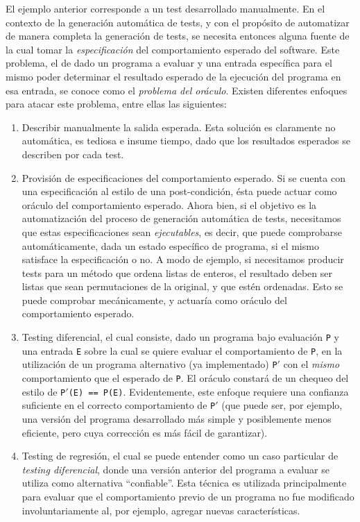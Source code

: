 El ejemplo anterior corresponde a un test desarrollado manualmente. En el contexto de la generaci\'on autom\'atica de tests, y con el prop\'osito de automatizar de manera completa la generaci\'on de tests, se necesita entonces alguna fuente de la cual tomar la \emph{especificaci\'on} del comportamiento esperado del software. Este problema, el de dado un programa a evaluar y una entrada espec\'ifica para el mismo poder determinar el resultado esperado de la ejecuci\'on del programa en esa entrada, se conoce como el \emph{problema del or\'aculo}. Existen diferentes enfoques para atacar este problema, entre ellas las siguientes: 
\begin{enumerate}
	\item Describir manualmente la salida esperada. Esta soluci\'on es claramente no autom\'atica, es tediosa e insume tiempo, dado que los resultados esperados se describen por cada test.
	
    \item Provisi\'on de especificaciones del comportamiento esperado. Si se cuenta con una especificaci\'on al estilo de una post-condici\'on, \'esta puede actuar como or\'aculo del comportamiento esperado. Ahora bien, si el objetivo es la automatizaci\'on del proceso de generaci\'on autom\'atica de tests, necesitamos que estas especificaciones sean \emph{ejecutables}, es decir, que puede comprobarse autom\'aticamente, dada un estado espec\'ifico de programa, si el mismo satisface la especificaci\'on o no. A modo de ejemplo, si necesitamos producir tests para un m\'etodo que ordena listas de enteros, el resultado deben ser listas que sean permutaciones de la original, y que est\'en ordenadas. Esto se puede comprobar mec\'anicamente, y actuar\'ia como or\'aculo del comportamiento esperado. 
	
	\item Testing diferencial, el cual consiste, dado un programa bajo evaluaci\'on \texttt{P} y una entrada \texttt{E} sobre la cual se quiere evaluar el comportamiento de \texttt{P}, en la utilizaci\'on de un programa alternativo (ya implementado) \texttt{P$\prime$} con el \emph{mismo} comportamiento que el esperado de \texttt{P}. El or\'aculo constar\'a de un chequeo del estilo de \texttt{P$\prime$(E) == P(E)}. Evidentemente, este enfoque requiere una confianza suficiente en el correcto comportamiento de \texttt{P$\prime$} (que puede ser, por ejemplo, una versi\'on del programa desarrollado m\'as simple y posiblemente menos eficiente, pero cuya correcci\'on es m\'as f\'acil de garantizar). 
	
	\item Testing de regresi\'on, el cual se puede entender como un caso particular de \emph{testing diferencial}, donde una versi\'on anterior del programa a evaluar se utiliza como alternativa ``confiable''. Esta t\'ecnica es utilizada principalmente para evaluar que el comportamiento previo de un programa no fue modificado involuntariamente al, por ejemplo, agregar nuevas caracter\'isticas.
	
\end{enumerate}

